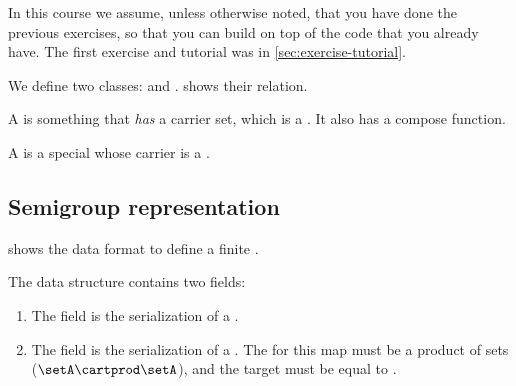 
\begin{remark}
    In this course we assume, unless otherwise noted, that you have done the previous exercises, so that you can build on top of the code that you already have.
    The first exercise and tutorial was in \cref{sec:exercise-tutorial}.
\end{remark}

\begin{figure*}[b]
    \caption{}
    \label{fig:uml_semigroup}
\end{figure*}

We define two classes: \Semigroup and \FiniteSemigroup.
 shows their relation.

A \Semigroup is something that \emph{has} a carrier set, which is a \Setoid.
It also has a compose function.


A \FiniteSemigroup is a special \Semigroup whose carrier is a \FiniteSet.


\vfill\clearpage

\subsection{Semigroup representation}

\begin{marginfigure}%
    \caption{}%
    \label{fig:sm_min3}%
\end{marginfigure}%

 shows the data format to define a finite .

The data structure contains two fields:
\begin{enumerate}
    \item The field  is the serialization of a \FiniteSet \setA.
    \item The field  is the serialization of a \FiniteMap.
          The  for this map must be a product of sets ($\setA \cartprod \setA$), and the target must be equal to \setA.
\end{enumerate}


